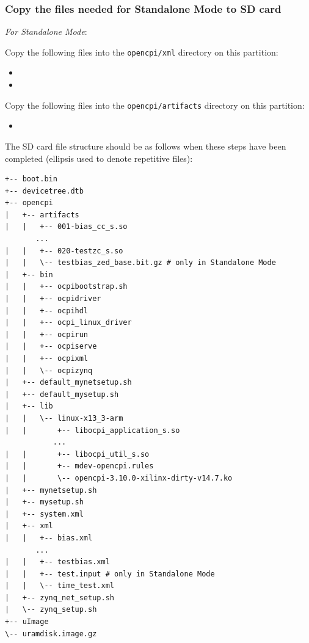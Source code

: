 \subsubsection*{Copy the files needed for Standalone Mode to SD card}
\textit{For Standalone Mode}:
\begin{itemize}
\begin{minipage}{\linewidth}
 \item Copy the following files into the \texttt{opencpi/xml} directory on this partition:
 \begin{itemize}
   \item {}
   \item {}
 \end{itemize}
 \item Copy the following files into the \texttt{opencpi/artifacts} directory on this partition:
 \begin{itemize}
   \item {}
 \end{itemize}
\end{minipage}
\end{itemize}

\newpage
\begin{flushleft}
The SD card file structure should be as follows when these steps have been completed (ellipsis used to denote repetitive files):
\end{flushleft}
\begin{verbatim}
+-- boot.bin
+-- devicetree.dtb
+-- opencpi
|   +-- artifacts
|   |   +-- 001-bias_cc_s.so
       ...
|   |   +-- 020-testzc_s.so
|   |   \-- testbias_zed_base.bit.gz # only in Standalone Mode
|   +-- bin
|   |   +-- ocpibootstrap.sh
|   |   +-- ocpidriver
|   |   +-- ocpihdl
|   |   +-- ocpi_linux_driver
|   |   +-- ocpirun
|   |   +-- ocpiserve
|   |   +-- ocpixml
|   |   \-- ocpizynq
|   +-- default_mynetsetup.sh
|   +-- default_mysetup.sh
|   +-- lib
|   |   \-- linux-x13_3-arm
|   |       +-- libocpi_application_s.so
           ...
|   |       +-- libocpi_util_s.so
|   |       +-- mdev-opencpi.rules
|   |       \-- opencpi-3.10.0-xilinx-dirty-v14.7.ko
|   +-- mynetsetup.sh
|   +-- mysetup.sh
|   +-- system.xml
|   +-- xml
|   |   +-- bias.xml
       ...
|   |   +-- testbias.xml
|   |   +-- test.input # only in Standalone Mode
|   |   \-- time_test.xml
|   +-- zynq_net_setup.sh
|   \-- zynq_setup.sh
+-- uImage
\-- uramdisk.image.gz

\end{verbatim}


